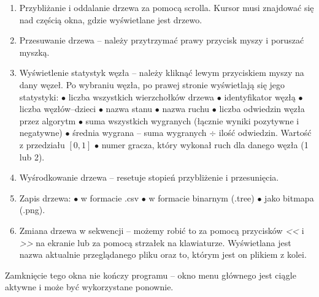 \documentclass{article}
\begin{document}
\begin{enumerate}
	\item Przybliżanie i oddalanie drzewa za pomocą scrolla. Kursor musi znajdować się nad częścią okna, gdzie wyświetlane jest drzewo.\\
	\item Przesuwanie drzewa – należy przytrzymać prawy przycisk myszy i poruszać myszką.\\
	\item Wyświetlenie statystyk węzła – należy kliknąć lewym przyciskiem myszy na dany węzeł. Po wybraniu węzła, po prawej stronie wyświetlają się jego statystyki:
	\subitem $\bullet$ liczba wszystkich wierzchołków drzewa
	\subitem $\bullet$ identyfikator węzłą
	\subitem $\bullet$ liczba węzłów–dzieci
	\subitem $\bullet$ nazwa stanu
	\subitem $\bullet$ nazwa ruchu
	\subitem $\bullet$ liczba odwiedzin węzła przez algorytm
	\subitem $\bullet$ suma wszystkich wygranych (łącznie wyniki pozytywne i negatywne)
	\subitem $\bullet$ średnia wygrana – suma wygranych $\div$ ilość odwiedzin. Wartość z przedziału $[0, 1]$
	\subitem $\bullet$ numer gracza, który wykonał ruch dla danego węzła (1 lub 2).\\
	\item Wyśrodkowanie drzewa – resetuje stopień przybliżenie i przesunięcia.\\
	\item Zapis drzewa:
	\subitem $\bullet$ w formacie .csv
	\subitem $\bullet$ w formacie binarnym (.tree)
	\subitem $\bullet$ jako bitmapa (.png).\\
	\item Zmiana drzewa w sekwencji – możemy robić to za pomocą przycisków \textit{<<} i \textit{>>} na ekranie lub za pomocą strzałek na klawiaturze. Wyświetlana jest nazwa aktualnie przeglądanego pliku oraz to, którym jest on plikiem z kolei.\\
\end{enumerate}
Zamknięcie tego okna nie kończy programu – okno menu głównego jest ciągle aktywne i może być wykorzystane ponownie.
\pagebreak
\end{document}
